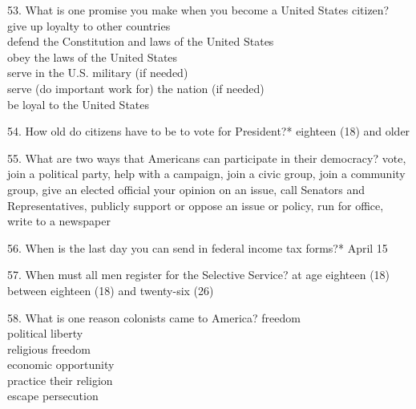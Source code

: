 \documentclass[avery5371,frame]{flashcards}
\begin{document}
        \begin{flashcard}{53. What is one promise you make when you become a United States citizen?}
        {give up loyalty to other countries\\defend the Constitution and laws of the United States\\obey the laws of the United States\\serve in the U.S. military (if needed)\\serve (do important work for) the nation (if needed)\\be loyal to the United States}
        \end{flashcard}
        \begin{flashcard}{54. How old do citizens have to be to vote for President?*}
        {eighteen (18) and older}
        \end{flashcard}
        \begin{flashcard}{55. What are two ways that Americans can participate in their democracy?}
        {vote\footnotesize, join a political party\footnotesize, help with a campaign\footnotesize, join a civic group\footnotesize, join a community group\footnotesize, give an elected official your opinion on an issue\footnotesize, call Senators and Representatives\footnotesize, publicly support or oppose an issue or policy\footnotesize, run for office\footnotesize, write to a newspaper}
        \end{flashcard}
        \begin{flashcard}{56. When is the last day you can send in federal income tax forms?*}
        {April 15}
        \end{flashcard}
        \begin{flashcard}{57. When must all men register for the Selective Service?}
        {at age eighteen (18)\\between eighteen (18) and twenty-six (26)}
        \end{flashcard}
        \begin{flashcard}{58. What is one reason colonists came to America?}
        {freedom\\political liberty\\religious freedom\\economic opportunity\\practice their religion\\escape persecution}
        \end{flashcard}
\end{document}
